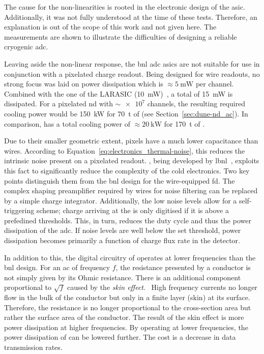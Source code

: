 The cause for the non-linearities is rooted in the electronic design of the \gls{asic}.
Additionally, it was not fully understood at the time of these tests.
Therefore, an explanation is out of the scope of this work and not given here.
The measurements are shown to illustrate the difficulties of designing a reliable cryogenic \gls{adc}.

Leaving aside the non-linear response, the \gls{bnl} \gls{adc} \glspl{asic} are not suitable for use in conjunction with a pixelated \lartpc{} charge readout.
Being designed for wire readouts, no strong focus was laid on power dissipation which is $\approx \SI{5}{\milli\watt}$ per channel.
Combined with the one of the LARASIC (\SI{10}{\milli\watt})~\cite{larasic}, a total of \SI{15}{\milli\watt} is dissipated.
For a pixelated \dune{} \gls{nd} with $\sim{\num{e7}}$ channels, the resulting required cooling power would be \SI{150}{\kilo\watt} for \SI{70}{\tonne} of \lar{} (see Section~\ref{sec:dune-nd_ac}).
In comparison, \uboone{} has a total cooling power of $\approx \SI{20}{\kilo\watt}$ for \SI{170}{\tonne} of \lar{}.~\cite{uboone}

Due to their smaller geometric extent, pixels have a much lower capacitance than wires.
According to Equation~\eqref{eq:electronics_thermal-noise}, this reduces the intrinsic noise present on a pixelated readout.
\larpix{}, being developed by \gls{lbnl}~\cite{larpix}, exploits this fact to significantly reduce the complexity of the cold electronics.
Two key points distinguish them from the \gls{bnl} design for the wire-equipped \gls{fd}.
The complex shaping preamplifier required by wires for noise filtering can be replaced by a simple charge integrator.
Additionally, the low noise levels allow for a self-triggering scheme; charge arriving at the \larpix{} is only digitised if it is above a prefedined thresholds.
This, in turn, reduces the duty cycle and thus the power dissipation of the \gls{adc}.
If noise levels are well below the set threshold, power dissipation becomes primarily a function of charge flux rate in the detector.

In addition to this, the digital circuitry of \larpix{} operates at lower frequencies than the \gls{bnl} design.
For an \gls{ac} of frequency $f$, the resistance presented by a conductor is not simply given by its Ohmic resistance.
There is an additional component proportional to $\sqrt{f}$ caused by the \emph{skin effect}.~\cite{horowitzHill}
High frequency currents no longer flow in the bulk of the conductor but only in a finite layer (skin) at its surface.
Therefore, the resistance is no longer proportional to the cross-section area but rather the surface area of the conductor.
The result of the skin effect is more power dissipation at higher frequencies.
By operating at lower frequencies, the power dissipation of \larpix{} can be lowered further.
The cost is a decrease in data transmission rates.

